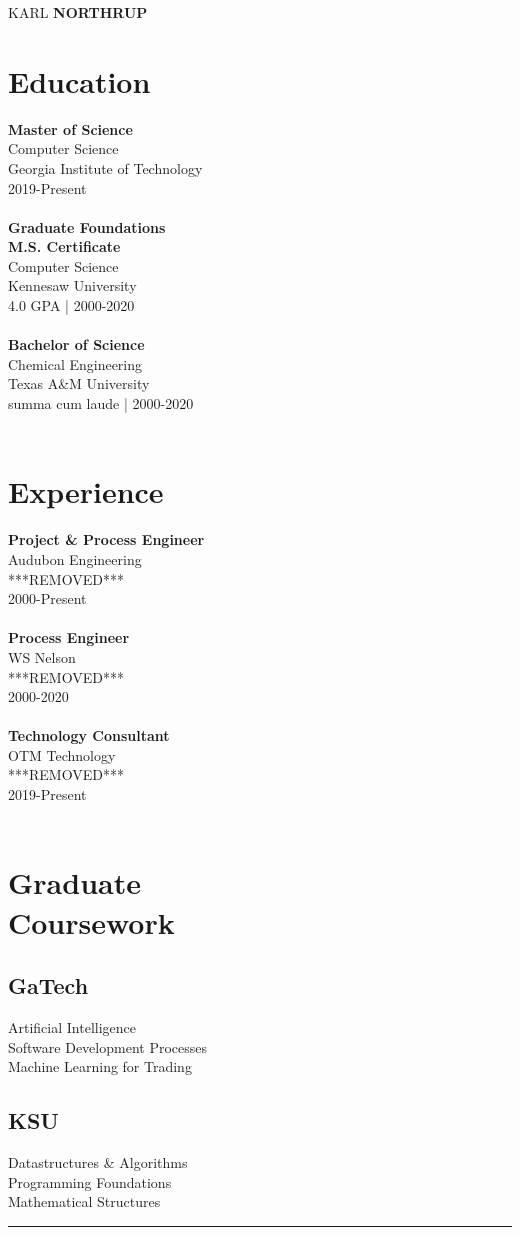 \documentclass[]{article}
\newcommand{\name}[2]{%
	\begin{tcolorbox}[sharp corners, colback=white, colframe=blue!80!yellow, width=0.55\linewidth, center]
	\centerline{\Huge{\uppercase{#1} \color{blue!80!yellow}\bf\uppercase{#2}}}
	\end{tcolorbox} 
	\vspace{2em}
}
\newcommand{\school}[4]{%
	{\bf#1}\\
	#2\\
	#3\\
	#4\\
	\\
}
\newcommand{\courses}[3]{%
	\vspace{-5pt}
	#1\\
	#2\\
	#3\\
}
\begin{document}
	\name{Karl}{Northrup}
	\par\begin{minipage}[t]{0.30\textwidth}
		\section{Education}
			\school{Master of Science}{Computer Science}{Georgia Institute of Technology}{2019-Present}
			\school{Graduate Foundations\\M.S. Certificate}{Computer Science}{Kennesaw University}{4.0 GPA | 2000-2020}
			\school{Bachelor of Science}{Chemical Engineering}{Texas A\&M University}{summa cum laude | 2000-2020}
		\section{Experience}
			\school{Project \& Process Engineer}{Audubon Engineering}{***REMOVED***}{2000-Present}
			\school{Process Engineer}{WS Nelson}{***REMOVED***}{2000-2020}
			\school{Technology Consultant}{OTM Technology}{***REMOVED***}{2019-Present}
		\section{Graduate\\Coursework}
		\subsection{GaTech}
			\courses{Artificial Intelligence}{Software Development Processes}{Machine Learning for Trading}
		\subsection{KSU}
			\courses{Datastructures \& Algorithms}{Programming Foundations}{Mathematical Structures}
	\end{minipage}%
	\begin{minipage}[t]{0.10\textwidth}
		\centering\vspace{-15pt}\color{blue!80}\rule{2pt}{620pt}
	\end{minipage}\hfill
\end{document}
